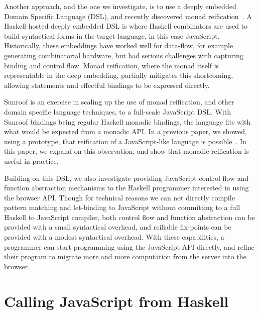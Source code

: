 \documentclass{llncs}
\begin{document}
Another approach, and the one we investigate,
is to use a deeply embedded Domain Specific Language (DSL), and
recently discovered monad reification~\cite{..,..,..}.
A Haskell-hosted deeply embedded DSL is where Haskell combinators 
are used to build syntactical forms in the target language,
in this case JavaScript.
Historically, these embeddings have worked well for 
data-flow, for example generating combinatorial hardware,
but had serious challenges with capturing binding and control flow.
Monad reification, where the monad itself is representable in the deep embedding,
partially mitigates this shortcoming, allowing statements and
effectful bindings to be expressed directly.

Sunroof is an exercise in scaling up the use of monad reification,
and other domain specific language techniques, to a full-scale JavaScript DSL.
With Sunroof bindings being regular Haskell monadic bindings, 
the language fits with what would be expected from a monadic API. 
In a previous paper, we showed, using a prototype,
that reification of a JavaScript-like language is possible~\cite{Farmer:12:WebDSLs}.
In this paper, we expand on this observation,
and show that monadic-reification is useful in practice.

Building on this DSL, we also investigate providing
JavaScript control flow and function abstraction mechanisms
to the Haskell programmer interested in using the browser API.
Though for technical reasons we can not directly compile
pattern matching and let-binding to JavaScript without committing
to a full Haskell to JavaScript compiler, both
control flow and function abstraction can be provided
with a small syntactical overhead, and reifiable fix-points 
can be provided with a modest syntactical overhead.
With these capabilities, a programmer can start programming
using the JavaScript API directly, and refine
their program to migrate more and more computation
from the server into the browser. 


\section{Calling JavaScript from Haskell}
\label{sec:js-rpc}
\end{document}
